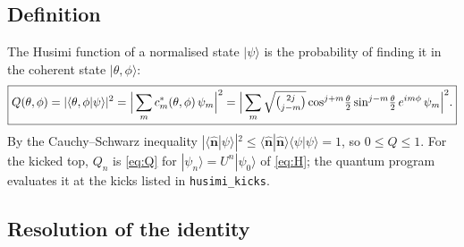 \documentclass[11pt,a4paper]{article}
\newcommand{\vn}{\hat{\bm n}}
\begin{document}
\subsection{Definition}

The Husimi function of a normalised state $|\psi\rangle$ is the probability of finding it in the coherent state
$|\theta,\phi\rangle$:
\begin{equation}\label{eq:Q}
  \boxed{Q(\theta,\phi) = |\langle\theta,\phi|\psi\rangle|^2
  = \Big|\sum_m c_m^*(\theta,\phi)\,\psi_m\Big|^2
  = \Big|\sum_m \sqrt{\tbinom{2j}{j-m}}\cos^{j+m}\!\tfrac{\theta}{2}\sin^{j-m}\!\tfrac{\theta}{2}\,e^{im\phi}\,\psi_m\Big|^2 .}
\end{equation}
By the Cauchy--Schwarz inequality $|\langle\vn|\psi\rangle|^2\le\langle\vn|\vn\rangle\langle\psi|\psi\rangle = 1$, so
$0\le Q\le1$. For the kicked top, $Q_n$ is \eqref{eq:Q} for $|\psi_n\rangle = U^n|\psi_0\rangle$ of \eqref{eq:H}; the
quantum program evaluates it at the kicks listed in \texttt{husimi\_kicks}.

\subsection{Resolution of the identity}\label{sec:resolution}
\end{document}

